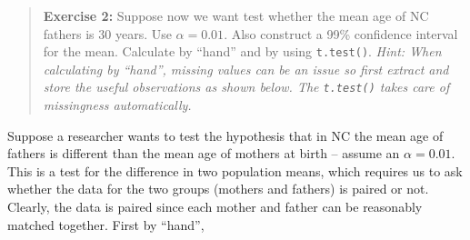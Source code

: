\documentclass[]{book}
\newenvironment{Shaded}{\begin{snugshade}}{\end{snugshade}}
\newcommand{\KeywordTok}[1]{\textcolor[rgb]{0.13,0.29,0.53}{\textbf{{#1}}}}
\newcommand{\StringTok}[1]{\textcolor[rgb]{0.31,0.60,0.02}{{#1}}}
\newcommand{\CommentTok}[1]{\textcolor[rgb]{0.56,0.35,0.01}{\textit{{#1}}}}
\newcommand{\NormalTok}[1]{{#1}}
\theoremstyle{definition}
\theoremstyle{definition}
\theoremstyle{definition}
\theoremstyle{remark}
\begin{document}
\begin{quote}
\textbf{Exercise 2:} Suppose now we want test whether the mean age of NC
fathers is 30 years. Use \(\alpha = 0.01\). Also construct a 99\%
confidence interval for the mean. Calculate by ``hand'' and by using
\texttt{t.test()}. \emph{Hint: When calculating by ``hand'', missing
values can be an issue so first extract and store the useful
observations as shown below. The \texttt{t.test()} takes care of
missingness automatically.}
\end{quote}

\begin{Shaded}
\end{Shaded}

Suppose a researcher wants to test the hypothesis that in NC the mean
age of fathers is different than the mean age of mothers at birth --
assume an \(\alpha = 0.01\). This is a test for the difference in two
population means, which requires us to ask whether the data for the two
groups (mothers and fathers) is paired or not. Clearly, the data is
paired since each mother and father can be reasonably matched together.
First by ``hand'',
\end{document}
